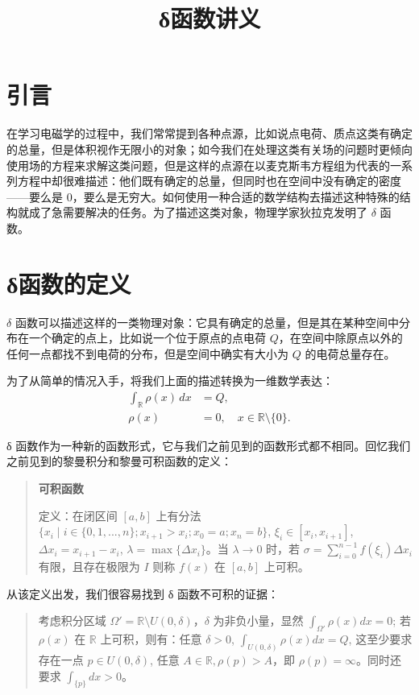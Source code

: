 \documentclass[12pt]{article}
\title{δ函数讲义}
\author{}
\date{}
\begin{document}
\maketitle

\section*{引言}

在学习电磁学的过程中，我们常常提到各种点源，比如说点电荷、质点这类有确定的总量，但是体积视作无限小的对象；如今我们在处理这类有关场的问题时更倾向使用场的方程来求解这类问题，但是这样的点源在以麦克斯韦方程组为代表的一系列方程中却很难描述：他们既有确定的总量，但同时也在空间中没有确定的密度——要么是 $0$，要么是无穷大。如何使用一种合适的数学结构去描述这种特殊的结构就成了急需要解决的任务。为了描述这类对象，物理学家狄拉克发明了 $\delta$ 函数。

\section*{δ函数的定义}

$\delta$ 函数可以描述这样的一类物理对象：它具有确定的总量，但是其在某种空间中分布在一个确定的点上，比如说一个位于原点的点电荷 $Q$，在空间中除原点以外的任何一点都找不到电荷的分布，但是空间中确实有大小为 $Q$ 的电荷总量存在。

为了从简单的情况入手，将我们上面的描述转换为一维数学表达：
\begin{align*}
\int_{\mathbb{R}} \rho(x) \, dx &= Q, \\
\rho(x) &= 0, \quad x \in \mathbb{R} \setminus \{0\}.
\end{align*}

δ 函数作为一种新的函数形式，它与我们之前见到的函数形式都不相同。回忆我们之前见到的黎曼积分和黎曼可积函数的定义：

\begin{quote}
\textbf{可积函数}

定义：在闭区间 $[a,b]$ 上有分法 $\{x_i \mid i \in \{0,1,...,n\}; x_{i+1}>x_i; x_0 =a; x_n=b\}$, $\xi_i \in [x_{i},x_{i+1}]$, $\Delta x_i = x_{i+1} - x_i$, $\lambda = \max \{\Delta x_i\}$。当 $\lambda \to 0$ 时，若 $\sigma = \sum_{i=0}^{n-1} f(\xi_i)\Delta x_i$ 有限，且存在极限为 $I$ 则称 $f(x)$ 在 $[a,b]$ 上可积。
\end{quote}

从该定义出发，我们很容易找到 δ 函数不可积的证据：

\begin{quote}
考虑积分区域 $\Omega' = \mathbb{R} \setminus U(0,\delta)$，$\delta$ 为非负小量，显然 $\int_{\Omega'} \rho(x) dx = 0$; 若 $\rho(x)$ 在 $\mathbb{R}$ 上可积，则有：任意 $\delta>0$, $\int_{U(0,\delta)} \rho(x) dx = Q$, 这至少要求存在一点 $p \in U(0,\delta)$, 任意 $A \in \mathbb{R}, \rho(p) > A$，即 $\rho(p)= \infty$。同时还要求 $\int_{\{p\}} dx > 0$。
\end{quote}
\end{document}
